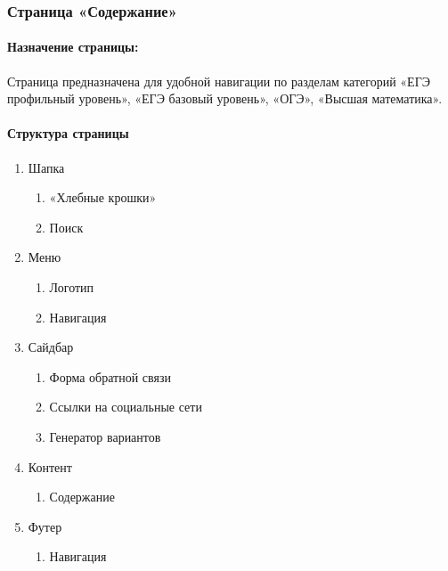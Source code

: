 \subsubsection{Страница «Содержание»}
\paragraph{Назначение страницы:} Страница предназначена для удобной навигации по разделам категорий «ЕГЭ профильный уровень», «ЕГЭ базовый уровень», «ОГЭ», «Высшая математика».

\paragraph{Структура страницы}
\begin{enumerate}
	\item Шапка
	\begin{enumerate}
		\item «Хлебные крошки»
		\item Поиск
	\end{enumerate}

	\item Меню
	\begin{enumerate}
		\item Логотип
		\item Навигация
	\end{enumerate}

	\item Сайдбар
	\begin{enumerate}
		\item Форма обратной связи
		\item Ссылки на социальные сети
		\item Генератор вариантов
	\end{enumerate}

	\item Контент
	\begin{enumerate}
		\item Содержание
	\end{enumerate}

	\item Футер
	\begin{enumerate}
		\item Навигация
	\end{enumerate}
\end{enumerate}

